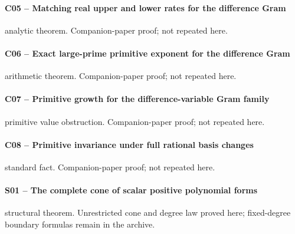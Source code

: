 \paragraph{C05 -- Matching real upper and lower rates for the difference Gram}\label{record-C05}
analytic theorem. Companion-paper proof; not repeated here.
\par\smallskip{}\par
\paragraph{C06 -- Exact large-prime primitive exponent for the difference Gram}\label{record-C06}
arithmetic theorem. Companion-paper proof; not repeated here.
\par\smallskip{}\par
\paragraph{C07 -- Primitive growth for the difference-variable Gram family}\label{record-C07}
primitive value obstruction. Companion-paper proof; not repeated here.
\par\smallskip{}\par
\paragraph{C08 -- Primitive invariance under full rational basis changes}\label{record-C08}
standard fact. Companion-paper proof; not repeated here.
\par\smallskip{}\par
\paragraph{S01 -- The complete cone of scalar positive polynomial forms}\label{record-S01}
structural theorem. Unrestricted cone and degree law proved here; fixed-degree boundary formulas remain in the archive.
\par\smallskip{}\par
